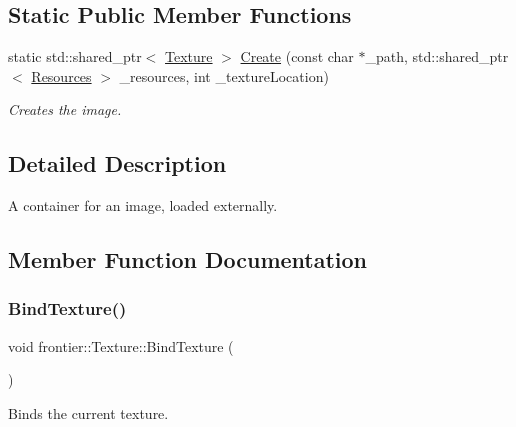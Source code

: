 \subsection*{Static Public Member Functions}
\begin{DoxyCompactItemize}
\item 
static std\+::shared\+\_\+ptr$<$ \hyperlink{classfrontier_1_1_texture}{Texture} $>$ \hyperlink{classfrontier_1_1_texture_a52eabdae7b6d59bdc14cde2e4ae95f26}{Create} (const char $\ast$\+\_\+path, std\+::shared\+\_\+ptr$<$ \hyperlink{classfrontier_1_1_resources}{Resources} $>$ \+\_\+resources, int \+\_\+texture\+Location)
\begin{DoxyCompactList}\small\item\em Creates the image. \end{DoxyCompactList}\end{DoxyCompactItemize}


\subsection{Detailed Description}
A container for an image, loaded externally. 

\subsection{Member Function Documentation}
\mbox{\label{classfrontier_1_1_texture_ae983ce4ddd78a5170e3beed65b17ae3f}} 
\subsubsection{\texorpdfstring{Bind\+Texture()}{BindTexture()}}
{\footnotesize\ttfamily void frontier\+::\+Texture\+::\+Bind\+Texture (\begin{DoxyParamCaption}{ }\end{DoxyParamCaption})}



Binds the current texture. 

\mbox{\label{classfrontier_1_1_texture_a52eabdae7b6d59bdc14cde2e4ae95f26}} 
